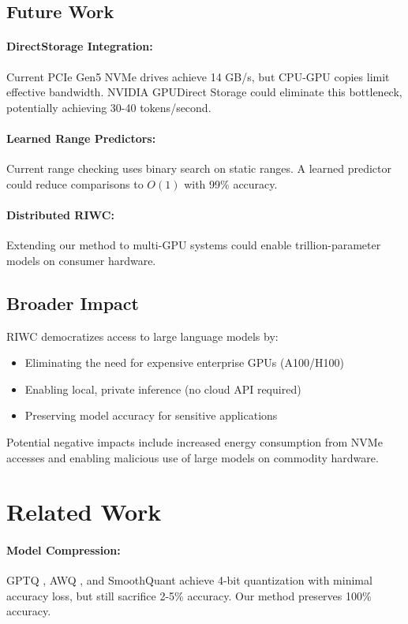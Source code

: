 \documentclass[twocolumn,10pt]{article}
\begin{document}
\subsection{Future Work}

\paragraph{DirectStorage Integration:} Current PCIe Gen5 NVMe drives achieve 14 GB/s, but CPU-GPU copies limit effective bandwidth. NVIDIA GPUDirect Storage could eliminate this bottleneck, potentially achieving 30-40 tokens/second.

\paragraph{Learned Range Predictors:} Current range checking uses binary search on static ranges. A learned predictor could reduce comparisons to $O(1)$ with 99\% accuracy.

\paragraph{Distributed RIWC:} Extending our method to multi-GPU systems could enable trillion-parameter models on consumer hardware.

\subsection{Broader Impact}

RIWC democratizes access to large language models by:
\begin{itemize}
    \item Eliminating the need for expensive enterprise GPUs (A100/H100)
    \item Enabling local, private inference (no cloud API required)
    \item Preserving model accuracy for sensitive applications
\end{itemize}

Potential negative impacts include increased energy consumption from NVMe accesses and enabling malicious use of large models on commodity hardware.

\section{Related Work}

\paragraph{Model Compression:} GPTQ \cite{frantar2022gptq}, AWQ \cite{lin2023awq}, and SmoothQuant \cite{xiao2023smoothquant} achieve 4-bit quantization with minimal accuracy loss, but still sacrifice 2-5\% accuracy. Our method preserves 100\% accuracy.
\end{document}
